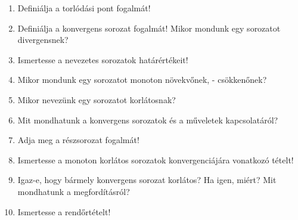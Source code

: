 \vfill
\begin{questions}[section.03.03]
  \begin{enumerate}
    \item Definiálja a torlódási pont fogalmát!
    \item Definiálja a konvergens sorozat fogalmát! Mikor mondunk egy sorozatot
          divergensnek?
    \item Ismertesse a nevezetes sorozatok határértékeit!
    \item Mikor mondunk egy sorozatot monoton növekvőnek, - csökkenőnek?
    \item Mikor nevezünk egy sorozatot korlátosnak?
    \item Mit mondhatunk a konvergens sorozatok és a műveletek kapcsolatáról?
    \item Adja meg a részsorozat fogalmát!
    \item Ismertesse a monoton korlátos sorozatok konvergenciájára vonatkozó
          tételt!
    \item Igaz-e, hogy bármely konvergens sorozat korlátos? Ha igen, miért? Mit
          mondhatunk a megfordításról?
    \item Ismertesse a rendőrtételt!
  \end{enumerate}
\end{questions}